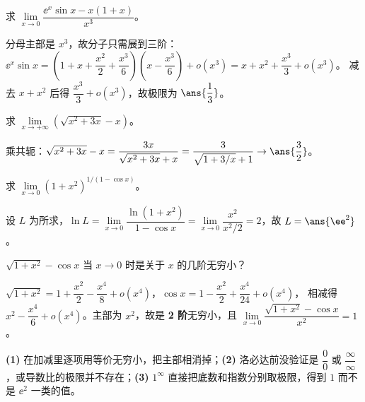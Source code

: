 \documentclass[11pt,a4paper]{ctexart}
\begin{document}
\begin{exa}[乘积展开确定阶数]
求 $\lim\limits_{x\to0}\dfrac{\ee^x\sin x-x(1+x)}{x^3}$。
\end{exa}
\begin{solution}
分母主部是 $x^3$，故分子只需展到三阶：
$\ee^x\sin x=\left(1+x+\dfrac{x^2}{2}+\dfrac{x^3}{6}\right)\left(x-\dfrac{x^3}{6}\right)+o(x^3)
=x+x^2+\dfrac{x^3}{3}+o(x^3)$。
减去 $x+x^2$ 后得 $\dfrac{x^3}{3}+o(x^3)$，故极限为 $\ans{\dfrac13}$。
\end{solution}

\begin{exa}
求 $\lim\limits_{x\to+\infty}\left(\sqrt{x^2+3x}-x\right)$。
\end{exa}
\begin{solution}
乘共轭：$\sqrt{x^2+3x}-x=\dfrac{3x}{\sqrt{x^2+3x}+x}=\dfrac{3}{\sqrt{1+3/x}+1}\to\ans{\dfrac32}$。
\end{solution}

\begin{exa}
求 $\lim\limits_{x\to0}(1+x^2)^{1/(1-\cos x)}$。
\end{exa}
\begin{solution}
设 $L$ 为所求，$\ln L=\lim\limits_{x\to0}\dfrac{\ln(1+x^2)}{1-\cos x}
=\lim\limits_{x\to0}\dfrac{x^2}{x^2/2}=2$，故 $L=\ans{\ee^2}$。
\end{solution}

\begin{exa}[无穷小的阶]
$\sqrt{1+x^2}-\cos x$ 当 $x\to0$ 时是关于 $x$ 的几阶无穷小？
\end{exa}
\begin{solution}
$\sqrt{1+x^2}=1+\dfrac{x^2}{2}-\dfrac{x^4}{8}+o(x^4)$，$\cos x=1-\dfrac{x^2}{2}+\dfrac{x^4}{24}+o(x^4)$，
相减得 $x^2-\dfrac{x^4}{6}+o(x^4)$。主部为 $x^2$，故是 \textbf{2 阶}无穷小，且
$\lim\limits_{x\to0}\dfrac{\sqrt{1+x^2}-\cos x}{x^2}=1$。
\end{solution}

\begin{warnbox}[本章最常丢分的三处]
\textbf{(1)} 在加减里逐项用等价无穷小，把主部相消掉；\textbf{(2)} 洛必达前没验证是 $\dfrac00$ 或 $\dfrac{\infty}{\infty}$，或导数比的极限并不存在；\textbf{(3)} $1^\infty$ 直接把底数和指数分别取极限，得到 $1$ 而不是 $\ee^2$ 一类的值。
\end{warnbox}
\end{document}
